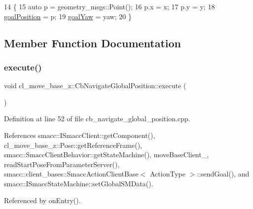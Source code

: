 \begin{DoxyCode}
14     \{
15         \textcolor{keyword}{auto} p = geometry\_msgs::Point();
16         p.x = x;
17         p.y = y;
18         \hyperlink{classcl__move__base__z_1_1CbNavigateGlobalPosition_a51a0266fd9a63e99f26e88933529c559}{goalPosition} = p;
19         \hyperlink{classcl__move__base__z_1_1CbNavigateGlobalPosition_a839900de7f664b27c9be189fadbaa003}{goalYaw} = yaw;
20     \}
\end{DoxyCode}


\subsection{Member Function Documentation}
\mbox{\label{classcl__move__base__z_1_1CbNavigateGlobalPosition_a0b8525ea9e4388b27cb1f9b1e06a3b63}} 
\subsubsection{\texorpdfstring{execute()}{execute()}}
{\footnotesize\ttfamily void cl\+\_\+move\+\_\+base\+\_\+z\+::\+Cb\+Navigate\+Global\+Position\+::execute (\begin{DoxyParamCaption}{ }\end{DoxyParamCaption})}



Definition at line 52 of file cb\+\_\+navigate\+\_\+global\+\_\+position.\+cpp.



References smacc\+::\+I\+Smacc\+Client\+::get\+Component(), cl\+\_\+move\+\_\+base\+\_\+z\+::\+Pose\+::get\+Reference\+Frame(), smacc\+::\+Smacc\+Client\+Behavior\+::get\+State\+Machine(), move\+Base\+Client\+\_\+, read\+Start\+Pose\+From\+Parameter\+Server(), smacc\+::client\+\_\+bases\+::\+Smacc\+Action\+Client\+Base$<$ Action\+Type $>$\+::send\+Goal(), and smacc\+::\+I\+Smacc\+State\+Machine\+::set\+Global\+S\+M\+Data().



Referenced by on\+Entry().


